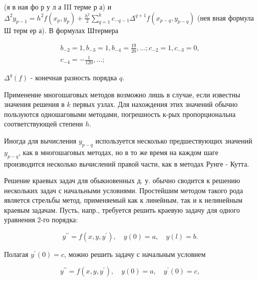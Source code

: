 \documentclass[10pt]{article}
\begin{document}
(я в ная фо р у л а III терме р а) и $\Delta^{2} y_{p-1}=h^{2} f\left(x_{p}, y_{p}\right)+\frac{h^{2}}{2} \sum_{q=1}^{k} c_{-q-1} \Delta^{q+1} f\left(x_{p-q}, y_{p-q}\right)$ (нея вная формула Ш терм ер а). В формулах Штермера



\[

\begin{gathered}

b_{-2}=1, b_{-3}=1, b_{-4}=\frac{19}{20}, \ldots ; c_{-2}=1, c_{-3}=0, \\

c_{-4}=-\frac{1}{120}, \ldots ;

\end{gathered}

\]



$\Delta^{q}(f)$ - конечная разность порядка $q$.



Применение многошаговых методов возможно лишь в случае, если известны значения решения в $k$ первых узлах. Для нахождения этих значений обычно пользуются одношаговыми методами, погрешность к-рых пропорциональна соответствующей степени $h$.



Иногда для вычисления $y_{p-q}$ используется несколько предшествующих значений $y_{p-q}$, как в многошаговых методах, но в то же время на каждом шаге производится несколько вычислений правой части, как в методах Рунге - Кутта.



Решение краевых задач для обыкновенных д. у. обычно сводится к решению нескольких задач с начальными условиями. Простейшим методом такого рода является стрельбы метод, применяемый как к линейным, так и к нелинейным краевым задачам. Пусть, напр., требуется решить краевую задачу для одного уравнения 2-го порядка:



\[

y^{\prime \prime}=f\left(x, y, y^{\prime}\right), \quad y(0)=a, \quad y(l)=b .

\]



Полагая $y^{\prime}(0)=c$, можно решить задачу с начальным условием



\[

y^{\prime \prime}=f\left(x, y, y^{\prime}\right), \quad y(0)=a, \quad y^{\prime}(0)=c,

\]
\end{document}
